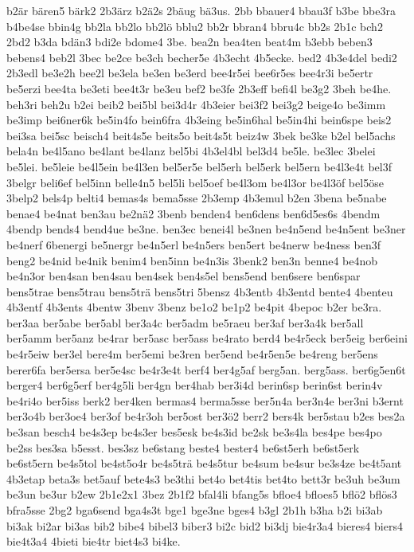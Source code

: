 {b2är
bären5
bärk2
2b3ärz
b2ä2s
2bäug
bä3us.
2bb
bbauer4
bbau3f
b3be
bbe3ra
b4be4se
bbin4g
bb2la
bb2lo
bb2lö
bblu2
bb2r
bbran4
bbru4c
bb2s
2b1c
bch2
2bd2
b3da
bdän3
bdi2e
bdome4
3be.
bea2n
bea4ten
beat4m
b3ebb
beben3
bebens4
beb2l
3bec
be2ce
be3ch
becher5e
4b3echt
4b5ecke.
bed2
4b3e4del
bedi2
2b3edl
be3e2h
bee2l
be3ela
be3en
be3erd
bee4r5ei
bee6r5es
bee4r3i
be5ertr
be5erzi
bee4ta
be3eti
bee4t3r
be3eu
bef2
be3fe
2b3eff
befi4l
be3g2
3beh
be4he.
beh3ri
beh2u
b2ei
beib2
bei5bl
bei3d4r
4b3eier
bei3f2
bei3g2
beige4o
be3imm
be3imp
bei6ner6k
be5in4fo
bein6fra
4b3eing
be5in6hal
be5in4hi
bein6spe
beis2
bei3sa
bei5sc
beisch4
beit4s5e
beits5o
beit4s5t
beiz4w
3bek
be3ke
b2el
bel5achs
bela4n
be4l5ano
be4lant
be4lanz
bel5bi
4b3el4bl
bel3d4
be5le.
be3lec
3belei
be5lei.
be5leie
be4l5ein
be4l3en
bel5er5e
bel5erh
bel5erk
bel5ern
be4l3e4t
bel3f
3belgr
beli6ef
bel5inn
belle4n5
bel5li
bel5oef
be4l3om
be4l3or
be4l3öf
bel5öse
3belp2
bels4p
belti4
bemas4s
bema5sse
2b3emp
4b3emul
b2en
3bena
be5nabe
benae4
be4nat
ben3au
be2nä2
3benb
benden4
ben6dens
ben6d5es6s
4bendm
4bendp
bends4
bend4ue
be3ne.
ben3ec
benei4l
be3nen
be4n5end
be4n5ent
be3ner
be4nerf
6benergi
be5nergr
be4n5erl
be4n5ers
ben5ert
be4nerw
be4ness
ben3f
beng2
be4nid
be4nik
benim4
ben5inn
be4n3is
3benk2
ben3n
benne4
be4nob
be4n3or
ben4san
ben4sau
ben4sek
ben4s5el
bens5end
ben6sere
ben6spar
bens5trae
bens5trau
bens5trä
bens5tri
5bensz
4b3entb
4b3entd
bente4
4benteu
4b3entf
4b3ents
4bentw
3benv
3benz
be1o2
be1p2
be4pit
4bepoc
b2er
be3ra.
ber3aa
ber5abe
ber5abl
ber3a4c
ber5adm
be5raeu
ber3af
ber3a4k
ber5all
ber5amm
ber5anz
be4rar
ber5asc
ber5ass
be4rato
berd4
be4r5eck
ber5eig
ber6eini
be4r5eiw
ber3el
bere4m
ber5emi
be3ren
ber5end
be4r5en5e
be4reng
ber5ens
berer6fa
ber5ersa
ber5e4sc
be4r3e4t
berf4
ber4g5af
berg5an.
berg5ass.
ber6g5en6t
berger4
ber6g5erf
ber4g5li
ber4gn
ber4hab
ber3i4d
berin6sp
berin6st
berin4v
be4ri4o
ber5iss
berk2
ber4ken
bermas4
berma5sse
ber5n4a
ber3n4e
ber3ni
b3ernt
ber3o4b
ber3oe4
ber3of
be4r3oh
ber5ost
ber3ö2
berr2
bers4k
ber5stau
b2es
bes2a
be3san
besch4
be4s3ep
be4s3er
bes5esk
be4s3id
be2sk
be3s4la
bes4pe
bes4po
be2ss
bes3sa
b5esst.
bes3sz
be6stang
beste4
bester4
be6st5erh
be6st5erk
be6st5ern
be4s5tol
be4st5o4r
be4s5trä
be4s5tur
be4sum
be4sur
be3s4ze
be4t5ant
4b3etap
beta3s
bet5auf
bete4s3
be3thi
bet4o
bet4tis
bet4to
bett3r
be3uh
be3um
be3un
be3ur
b2ew
2b1e2x1
3bez
2b1f2
bfal4li
bfang5s
bfloe4
bfloes5
bflö2
bflös3
bfra5sse
2bg2
bga6send
bga4s3t
bge1
bge3ne
bges4
b3gl
2b1h
b3ha
b2i
bi3ab
bi3ak
bi2ar
bi3as
bib2
bibe4
bibel3
biber3
bi2c
bid2
bi3dj
bie4r3a4
bieres4
biers4
bie4t3a4
4bieti
bie4tr
biet4s3
bi4ke.
}
